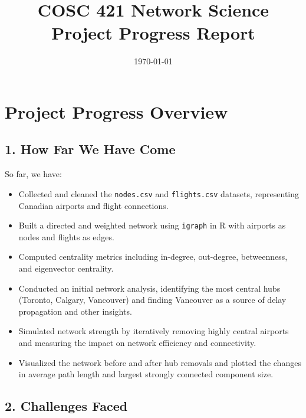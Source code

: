 \documentclass[11pt]{article}
\title{COSC 421 Network Science Project Progress Report}
\date{\today}
\begin{document}
\maketitle

\section*{Project Progress Overview}

\subsection*{1. How Far We Have Come}
So far, we have:
\begin{itemize}[leftmargin=*]
    \item Collected and cleaned the \texttt{nodes.csv} and \texttt{flights.csv} datasets, representing Canadian airports and flight connections.
    \item Built a directed and weighted network using \texttt{igraph} in R with airports as nodes and flights as edges.
    \item Computed centrality metrics including in-degree, out-degree, betweenness, and eigenvector centrality.
    \item Conducted an initial network analysis, identifying the most central hubs (Toronto, Calgary, Vancouver) and finding Vancouver as a source of delay propagation and other insights.
    \item Simulated network strength by iteratively removing highly central airports and measuring the impact on network efficiency and connectivity.
    \item Visualized the network before and after hub removals and plotted the changes in average path length and largest strongly connected component size.
\end{itemize}

\subsection*{2. Challenges Faced}
\end{document}
